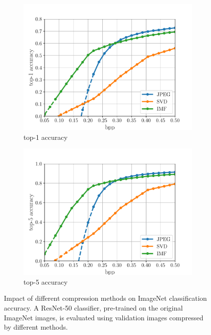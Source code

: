 \begin{figure}[t]
	\centering
	\begin{subfigure}{.45\textwidth}
		\centering
				\includegraphics[width=.95\textwidth]{figures/classification_performance_top1.pdf}
		\caption{top-1 accuracy}
		\label{fig: top1-vs-bpp imagenet}
	\end{subfigure}%
	\begin{subfigure}{.45\textwidth}
		\centering
				\includegraphics[width=.95\textwidth]{figures/classification_performance_top5.pdf}
		\caption{top-5 accuracy}
		\label{fig: top5-vs-bpp imagenet}
	\end{subfigure}
	\caption{Impact of different compression methods on ImageNet classification accuracy. 
    A ResNet-50 classifier, pre-trained on the original ImageNet images, is evaluated using validation images compressed by different methods.}
	\label{fig: imagenet_classification}
\end{figure}


